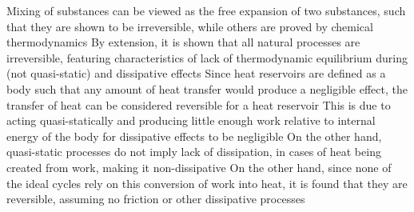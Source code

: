 \begin{outline*}
\3 Mixing of substances can be viewed as the free expansion of two substances, such that they are shown to be irreversible, while others are proved by chemical thermodynamics
\2 By extension, it is shown that all natural processes are irreversible, featuring characteristics of lack of thermodynamic equilibrium during (not quasi-static) and dissipative effects
\3 Since heat reservoirs are defined as a body such that any amount of heat transfer would produce a negligible effect, the transfer of heat can be considered reversible for a heat reservoir
\4 This is due to acting quasi-statically and producing little enough work relative to internal energy of the body for dissipative effects to be negligible
\3 On the other hand, quasi-static processes do not imply lack of dissipation, in cases of heat being created from work, making it non-dissipative
\3 On the other hand, since none of the ideal cycles rely on this conversion of work into heat, it is found that they are reversible, assuming no friction or other dissipative processes
\end{outline*}
